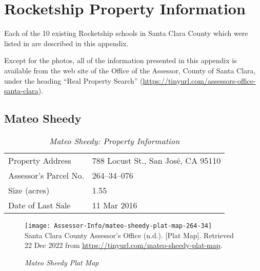 
\chapter{Rocketship Property Information}\label{ch:rocketship-property-info}\indent

Each of the 10 existing Rocketship schools in Santa Clara County which were listed in  are described in this appendix.

Except for the photos, all of the information presented in this appendix is available from the web site of the Office of the Assessor, County of Santa Clara, under the heading ``Real Property Search'' (\url{https://tinyurl.com/assessors-office-santa-clara}).

\clearpage


\section{Mateo Sheedy}\label{sec:mateo-sheedy-info}\indent

\begin{table}[htb]
  \SingleSpacing%
  \caption[Mateo Sheedy: Property Information]{\textit{Mateo Sheedy: Property Information}}\label{tab:mateo-sheedy-prop-info}
  \begin{tabular}{ll}
    \toprule
    Property Address      & 788 Locust St., San José, CA 95110 \\
    Assessor's Parcel No. &  264–34–076 \\
    Size (acres)          & 1.55 \\
    Date of Last Sale     & 11 Mar 2016 \\
    \bottomrule
  \end{tabular}
\end{table}

\begin{figure}[hbt]
    \caption[Mateo Sheedy Plat Map]{\textit{Mateo Sheedy Plat Map}}\label{fig:mateo-sheedy-plat-map}\indent
    \texttt{[image: Assessor-Info/mateo-sheedy-plat-map-264-34]}\\ %
    \footnotesize{Santa Clara County Assessor's Office (n.d.). [Plat Map]. Retrieved 22 Dec 2022 from  \url{https://tinyurl.com/mateo-sheedy-plat-map}}.
\end{figure}

